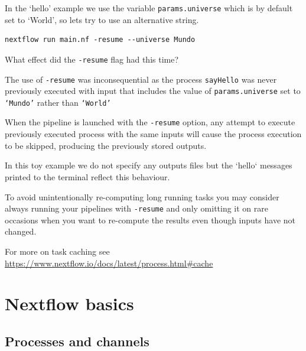 \begin{steps}

In the `hello' example we use the variable \texttt{params.universe} which is by default set to `World', so lets try to use an alternative string.

\begin{lstlisting}
nextflow run main.nf -resume --universe Mundo 
\end{lstlisting}
\end{steps}

\begin{questions}
What effect did the \texttt{-resume} flag had this time?
\begin{answer}
The use of \texttt{-resume} was inconsequential as the process \texttt{sayHello}
was never previously executed with input that includes the value of \texttt{params.universe} 
set to \texttt{`Mundo'} rather than \texttt{`World'}
\end{answer}
\end{questions}

\begin{note}
When the pipeline is launched with the \texttt{-resume} option, 
any attempt to execute previously executed process with the same inputs
will cause the process execution to be skipped, 
producing the previously stored outputs.

In this toy example we do not specify any outputs files
but the `hello` messages printed to the terminal 
reflect this behaviour.



To avoid unintentionally re-computing long running tasks you may consider 
always running your pipelines with \texttt{-resume} and only omitting it
on rare occasions when you want to re-compute the results
even though inputs have not changed. 

For more on task caching see \url{https://www.nextflow.io/docs/latest/process.html#cache}

\end{note}
\newpage

\section{Nextflow basics}

\subsection{Processes and channels}


